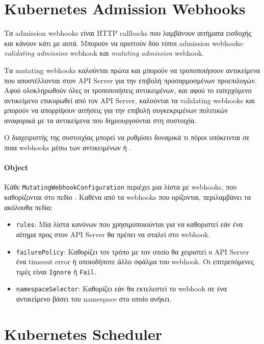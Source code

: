 \section{Kubernetes Admission Webhooks}

Τα admission webhooks είναι HTTP callbacks που λαμβάνουν αιτήματα εισδοχής και
κάνουν κάτι με αυτά. Μπορούν να οριστούν δύο τύποι admission webhooks:
\textit{validating admission} webhook και \textit{mutating admission} webhook.

Τα mutating webhooks καλούνται πρώτα και μπορούν να τροποποιήσουν
αντικείμενα που αποστέλλονται στον API Server για την επιβολή προσαρμοσμένων
προεπιλογών. Αφού ολοκληρωθούν όλες οι τροποποιήσεις αντικειμένων, και αφού το
εισερχόμενο αντικείμενο επικυρωθεί από τον  API Server, καλούνται τα validating
webhooks και μπορούν να απορρίψουν αιτήσεις για την επιβολή συγκεκριμένων
πολιτικών αναφορικά με τα αντικείμενα που δημιουργούνται στη συστοιχία.

Ο διαχειριστής της συστοιχίας μπορεί να ρυθμίσει δυναμικά τι πόροι υπόκεινται σε
ποια webhooks μέσω των αντικειμένων  ή
.

\paragraph*{ Object}

Κάθε \texttt{MutatingWebhookConfiguration} περιέχει μια λίστα με webhooks, που
καθορίζονται στο πεδίο . Καθένα από τα webhooks που ορίζονται,
περιλαμβάνει τα ακόλουθα πεδία:

\begin{itemize}
      \tightlist
      \item \texttt{rules}: Μία λίστα κανόνων που χρησιμοποιούνται για να
            καθοριστεί εάν ένα αίτημα προς στον API Server θα πρέπει να
            σταλεί στο webhook.
      \item \texttt{failurePolicy}: Καθορίζει τον τρόπο με τον οποίο θα
            χειριστεί ο API Server ένα timeout error ή οποιοδήποτε άλλο σφάλμα
            του webhook. Οι επιτρεπόμενες τιμές είναι \texttt{Ignore} ή
            \texttt{Fail}.
      \item \texttt{namespaceSelector}:  Καθορίζει εάν θα εκτελεστεί το webhook
            σε ένα αντικείμενο βάσει του namespace στο οποίο ανήκει.
\end{itemize}

\section{Kubernetes Scheduler} \label{section:gr-background_scheduler}

